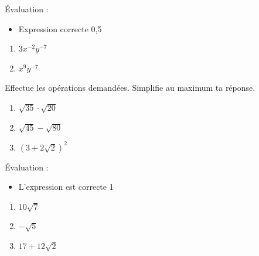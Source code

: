 \documentclass[../partie1.tex]{subfiles}
\begin{document}
\begin{solution}
    Évaluation :
    \begin{itemize}
        \item Expression correcte \hfill 0,5
    \end{itemize}
    \begin{enumerate}[cols=2]
        \item $3x^{-2}y^{-7}$
        \item $x^9y^{-7}$
    \end{enumerate}
\end{solution}
\begin{exercise}[points=3]
    Effectue les opérations demandées. Simplifie au maximum ta réponse.
    \begin{enumerate}[cols=3]
        \item $\sqrt{35}\cdot\sqrt{20}$
        \item $\sqrt{45}-\sqrt{80}$
        \item $\left(3 + 2\sqrt{2}\right)^2$
    \end{enumerate}
\end{exercise}
\begin{solution}
    Évaluation :
    \begin{itemize}
        \item L'expression est correcte \hfill 1
    \end{itemize}
    \begin{enumerate}[cols=3]
        \item $10 \sqrt{7}$
        \item $-\sqrt{5}$
        \item $17+12\sqrt{2}$
    \end{enumerate}
\end{solution}
\end{document}
